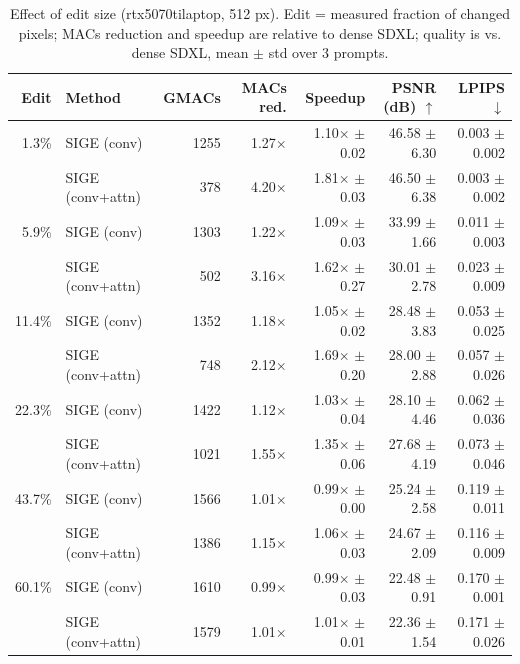 \begin{table}[t]
\centering
\small
\caption{Effect of edit size (rtx5070tilaptop, 512 px). Edit = measured fraction of changed pixels; MACs reduction and speedup are relative to dense SDXL; quality is vs. dense SDXL, mean $\pm$ std over 3 prompts.}
\label{tab:edit_size_rtx5070tilaptop}
\begin{tabular}{rlrrrrr}
\toprule
Edit & Method & GMACs & MACs red. & Speedup & PSNR (dB) $\uparrow$ & LPIPS $\downarrow$ \\
\midrule
1.3\% & SIGE (conv) & 1255 & 1.27$\times$ & 1.10$\times$ $\pm$ 0.02 & 46.58 $\pm$ 6.30 & 0.003 $\pm$ 0.002 \\
 & SIGE (conv+attn) & 378 & 4.20$\times$ & 1.81$\times$ $\pm$ 0.03 & 46.50 $\pm$ 6.38 & 0.003 $\pm$ 0.002 \\
\midrule
5.9\% & SIGE (conv) & 1303 & 1.22$\times$ & 1.09$\times$ $\pm$ 0.03 & 33.99 $\pm$ 1.66 & 0.011 $\pm$ 0.003 \\
 & SIGE (conv+attn) & 502 & 3.16$\times$ & 1.62$\times$ $\pm$ 0.27 & 30.01 $\pm$ 2.78 & 0.023 $\pm$ 0.009 \\
\midrule
11.4\% & SIGE (conv) & 1352 & 1.18$\times$ & 1.05$\times$ $\pm$ 0.02 & 28.48 $\pm$ 3.83 & 0.053 $\pm$ 0.025 \\
 & SIGE (conv+attn) & 748 & 2.12$\times$ & 1.69$\times$ $\pm$ 0.20 & 28.00 $\pm$ 2.88 & 0.057 $\pm$ 0.026 \\
\midrule
22.3\% & SIGE (conv) & 1422 & 1.12$\times$ & 1.03$\times$ $\pm$ 0.04 & 28.10 $\pm$ 4.46 & 0.062 $\pm$ 0.036 \\
 & SIGE (conv+attn) & 1021 & 1.55$\times$ & 1.35$\times$ $\pm$ 0.06 & 27.68 $\pm$ 4.19 & 0.073 $\pm$ 0.046 \\
\midrule
43.7\% & SIGE (conv) & 1566 & 1.01$\times$ & 0.99$\times$ $\pm$ 0.00 & 25.24 $\pm$ 2.58 & 0.119 $\pm$ 0.011 \\
 & SIGE (conv+attn) & 1386 & 1.15$\times$ & 1.06$\times$ $\pm$ 0.03 & 24.67 $\pm$ 2.09 & 0.116 $\pm$ 0.009 \\
\midrule
60.1\% & SIGE (conv) & 1610 & 0.99$\times$ & 0.99$\times$ $\pm$ 0.03 & 22.48 $\pm$ 0.91 & 0.170 $\pm$ 0.001 \\
 & SIGE (conv+attn) & 1579 & 1.01$\times$ & 1.01$\times$ $\pm$ 0.01 & 22.36 $\pm$ 1.54 & 0.171 $\pm$ 0.026 \\
\bottomrule
\end{tabular}
\end{table}

